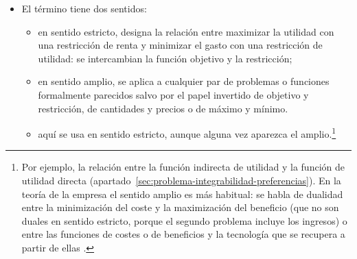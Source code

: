 \documentclass[11pt]{article}
\begin{document}
\begin{itemize}
\begin{itemize}
\begin{itemize}
\begin{itemize}
      \item y el índice verdadero de coste de la vida es de , que lo propuso en 1924\nocite{Konus1939Problem}.
      \end{itemize}
    \item {}:
      \begin{itemize}
      \item desde el sistema lineal de gasto de \textcite{Stone1954Linear}\footnote{ recibió el Premio Nobel de Economía en 1984 «por haber hecho contribuciones fundamentales al desarrollo de los sistemas de cuentas nacionales y, con ello, haber mejorado mucho la base del análisis económico empírico»\nocite{Nobel1984Stone}.} hasta el sistema casi ideal (AIDS) de \textcite{DeatonMuellbauer1980AIDS}, la estimación de la demanda se apoya en la dualidad: se parte de una función de gasto o de utilidad indirecta y las demandas se obtienen derivando;
      \item {} recibió el Premio Nobel de Economía en 2015 «por su análisis del consumo, la pobreza y el bienestar»\nocite{Nobel2015Deaton}, y los sistemas de demanda son una parte central de esa obra.
      \end{itemize}
    \end{itemize}
  \item El término  tiene dos sentidos:
    \begin{itemize}
    \item en sentido estricto, designa la relación entre maximizar la utilidad con una restricción de renta y minimizar el gasto con una restricción de utilidad: se intercambian la función objetivo y la restricción;
    \item en sentido amplio, se aplica a cualquier par de problemas o funciones formalmente parecidos salvo por el papel invertido de objetivo y restricción, de cantidades y precios o de máximo y mínimo\nocite{MasColellWhinstonGreen1995,Blume2008Duality}.
    \item aquí se usa en sentido estricto, aunque alguna vez aparezca el amplio.\footnote{Por ejemplo, la relación entre la función indirecta de utilidad y la función de utilidad directa (apartado~\ref{sec:problema-integrabilidad-preferencias}). En la teoría de la empresa el sentido amplio es más habitual: se habla de dualidad entre la minimización del coste y la maximización del beneficio (que no son duales en sentido estricto, porque el segundo problema incluye los ingresos) o entre las funciones de costes o de beneficios y la tecnología que se recupera a partir de ellas .}
    \end{itemize}
  \end{itemize}


\end{itemize}
\end{document}
